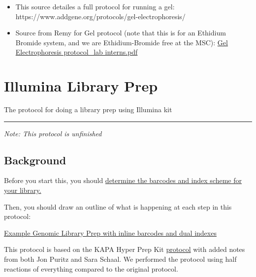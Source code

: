 \documentclass[
  letterpaper,
  DIV=11,
  numbers=noendperiod]{scrreprt}
\begin{document}

\begin{itemize}
\item
  This source detailes a full protocol for running a gel:
  https://www.addgene.org/protocols/gel-electrophoresis/
\item
  Source from Remy for Gel protocol (note that this is for an Ethidium
  Bromide system, and we are Ethidium-Bromide free at the MSC):
  \href{https://github.com/DrK-Lo/lotterhoslabprotocols/files/8584679/Gel.Electrophoresis.protocol_lab.interns.pdf}{Gel
  Electrophoresis protocol\_lab interns.pdf}\\
\end{itemize}

\hypertarget{illumina-library-prep}{%
\chapter{Illumina Library Prep}\label{illumina-library-prep}}

The protocol for doing a library prep using Illumina kit

\begin{center}\rule{0.5\linewidth}{0.5pt}\end{center}

\emph{Note: This protocol is unfinished}

\hypertarget{background}{%
\section*{\texorpdfstring{\textbf{Background}}{Background}}\label{background}}


Before you start this, you should
\href{https://bmford11.github.io/lotterhoslabprotocols/barcodesnindexes/}{determine
the barcodes and index scheme for your library.}

Then, you should draw an outline of what is happening at each step in
this protocol:

\href{https://docs.google.com/document/d/1xr99sMucP-x2rK6K61vtGHKNahl9UYFwh_oEb0AtHX8/edit}{Example
Genomic Library Prep with inline barcodes and dual indexes}

This protocol is based on the KAPA Hyper Prep Kit
\href{https://rochesequencingstore.com/wp-content/uploads/2017/10/KAPA-HyperPrep-Kit_KR0961-\%E2\%80\%93-v7.19.pdf}{protocol}
with added notes from both Jon Puritz and Sara Schaal. We performed the
protocol using half reactions of everything compared to the original
protocol.
\end{document}
